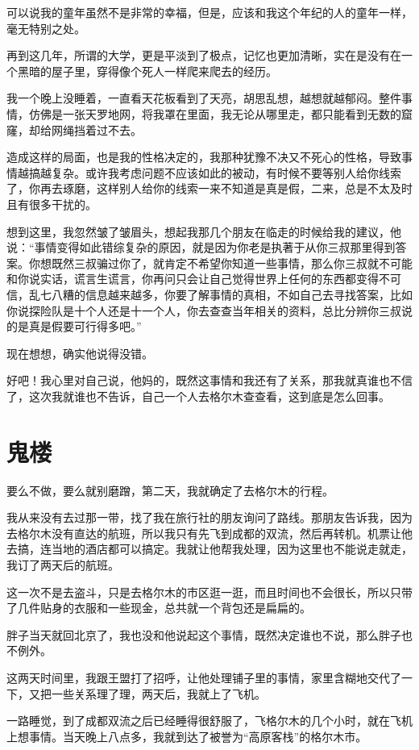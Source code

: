 可以说我的童年虽然不是非常的幸福，但是，应该和我这个年纪的人的童年一样，毫无特别之处。

再到这几年，所谓的大学，更是平淡到了极点，记忆也更加清晰，实在是没有在一个黑暗的屋子里，穿得像个死人一样爬来爬去的经历。

我一个晚上没睡着，一直看天花板看到了天亮，胡思乱想，越想就越郁闷。整件事情，仿佛是一张天罗地网，将我罩在里面，我无论从哪里走，都只能看到无数的窟窿，却给网绳挡着过不去。

造成这样的局面，也是我的性格决定的，我那种犹豫不决又不死心的性格，导致事情越搞越复杂。或许我考虑问题不应该如此的被动，有时候不要等别人给你线索了，你再去琢磨，这样别人给你的线索一来不知道是真是假，二来，总是不太及时且有很多干扰的。

想到这里，我忽然皱了皱眉头，想起我那几个朋友在临走的时候给我的建议，他说：“事情变得如此错综复杂的原因，就是因为你老是执著于从你三叔那里得到答案。你想既然三叔骗过你了，就肯定不希望你知道一些事情，那么你三叔就不可能和你说实话，谎言生谎言，你再问只会让自己觉得世界上任何的东西都变得不可信，乱七八糟的信息越来越多，你要了解事情的真相，不如自己去寻找答案，比如你说探险队是十个人还是十一个人，你去查查当年相关的资料，总比分辨你三叔说的是真是假要可行得多吧。”

现在想想，确实他说得没错。

好吧！我心里对自己说，他妈的，既然这事情和我还有了关系，那我就真谁也不信了，这次我就谁也不告诉，自己一个人去格尔木查查看，这到底是怎么回事。

\chapter{鬼楼}

要么不做，要么就别磨蹭，第二天，我就确定了去格尔木的行程。

我从来没有去过那一带，找了我在旅行社的朋友询问了路线。那朋友告诉我，因为去格尔木没有直达的航班，所以我只有先飞到成都的双流，然后再转机。机票让他去搞，连当地的酒店都可以搞定。我就让他帮我处理，因为这里也不能说走就走，我订了两天后的航班。

这一次不是去盗斗，只是去格尔木的市区逛一逛，而且时间也不会很长，所以只带了几件贴身的衣服和一些现金，总共就一个背包还是扁扁的。

胖子当天就回北京了，我也没和他说起这个事情，既然决定谁也不说，那么胖子也不例外。

这两天时间里，我跟王盟打了招呼，让他处理铺子里的事情，家里含糊地交代了一下，又把一些关系理了理，两天后，我就上了飞机。

一路睡觉，到了成都双流之后已经睡得很舒服了，飞格尔木的几个小时，就在飞机上想事情。当天晚上八点多，我就到达了被誉为“高原客栈”的格尔木市。


